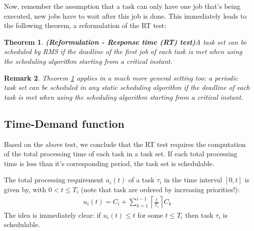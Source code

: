 \documentclass[a4paper,12pt]{article}
\newtheorem{theorem}{Theorem}[section]
\newtheorem{remark}[theorem]{Remark}
\theoremstyle{definition}
\begin{document}
 Now,  remember the assumption that a task can only have one job that's being executed, new jobs have to wait after this job is done. 
This immediately leads to the following theorem, a reformulation of the RT test:

\begin{theorem}\textbf{(Reformulation - Response time (RT) test)}\label{refor}
A task set can be scheduled by RMS if the deadline of the first job of each task is met when using the scheduling algorithm starting from a critical 
instant.
\end{theorem}

\begin{remark}
  Theorem \ref{refor} applies in a much more general setting too: a periodic 
  task set can be scheduled in any static scheduling algorithm if the deadline 
of each task is met when using the scheduling algorithm starting from a critical instant. 
\end{remark}
\subsection{Time-Demand function}
Based on the above test, we conclude that the RT test requires the computation 
of the total processing time of each task in a task set. If each total processing time is 
less than it's corresponding period, the task set is schedulable. 

The total processing requirement $u_i(t)$ of a task $\tau_i$ in the time interval $[0,t]$ 
is given by, with $0<t\leq T_i$ (note that task are ordered by increasing priorities!):
\begin{eqnarray}
 u_i(t) = C_i + \sum\limits_{k=1}^{i-1} \left \lceil{\frac{t}{T_i}}\right \rceil C_k
 \end{eqnarray}
The idea is immediately clear: if $u_i(t) \leq t$ for some $t \leq T_i$ then task $\tau_i$
is schedulable. 
\end{document}
